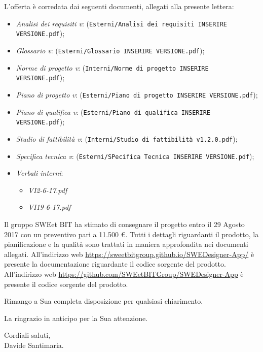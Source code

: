 	L'offerta è corredata dai seguenti documenti, allegati alla presente lettera:
	\begin{itemize}
		\item \emph{Analisi dei requisiti v\VersioneAR{}}: (\verb|Esterni/Analisi dei requisiti INSERIRE VERSIONE.pdf|);
		\item \emph{Glossario v\VersioneG{}}: (\verb|Esterni/Glossario INSERIRE VERSIONE.pdf|);
		\item \emph{Norme di progetto v\VersioneNP{}}: (\verb|Interni/Norme di progetto INSERIRE VERSIONE.pdf|);
		\item \emph{Piano di progetto v\VersionePP{}}: (\verb|Esterni/Piano di progetto INSERIRE VERSIONE.pdf|);
		\item \emph{Piano di qualifica v\VersionePQ{}}: (\verb|Esterni/Piano di qualifica INSERIRE VERSIONE.pdf|);
		\item \emph{Studio di fattibilità v\VersioneSF{}}: (\verb|Interni/Studio di fattibilità v1.2.0.pdf|);
		\item \emph{Specifica tecnica v\VersioneST{}}: (\verb|Esterni/SPecifica Tecnica INSERIRE VERSIONE.pdf|);
		\item \emph{Verbali interni}:
		\begin{itemize}
			\item \emph{VI2-6-17.pdf}
			\item \emph{VI19-6-17.pdf}
		\end{itemize}
	\end{itemize}
	Il gruppo SWEet BIT ha stimato di consegnare il progetto entro il 29 Agosto 2017
	con un preventivo pari a 11.500 \euro .
	Tutti i dettagli riguardanti il prodotto, la pianificazione e la qualità sono trattati in maniera approfondita
	nei documenti allegati.
	All'indirizzo web \url{https://sweetbitgroup.github.io/SWEDesigner-App/} è presente la documentazione riguardante il codice sorgente del prodotto.
	All'indirizzo web \url{https://github.com/SWEetBITGroup/SWEDesigner-App} è presente il codice sorgente del prodotto.
	\begin{flushleft}
	\vspace{2cm}
		Rimango a Sua completa disposizione per qualsiasi chiarimento.
	\end{flushleft}
	\begin{flushleft}
		La ringrazio in anticipo per la Sua attenzione.
	\end{flushleft}
	\vspace{5mm}
	\begin{center}
		Cordiali saluti,\\
		\vspace{1cm}Davide Santimaria.
	\end{center}
